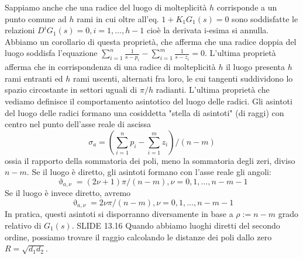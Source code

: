 \documentclass[11pt]{article}
\begin{document}
Sappiamo anche che una radice del luogo di molteplicità $h$ corrisponde a un punto comune ad $h$ rami in cui oltre all'eq. $1+K_1G_1(s)=0$ sono soddisfatte le relazioni $D^i G_1(s) = 0,i=1,\dots,h-1$ cioè la derivata i-esima si annulla. Abbiamo un corollario di questa proprietà, che afferma che una radice doppia del luogo soddisfa l'equazione $\sum_{i=1}^n \frac{1}{s-p_i} -\sum_{i=1}^m \frac{1}{s-z_i} = 0$. L'ultima proprietà afferma che in corrispondenza di una radice di molteplicità $h$ il luogo presenta $h$ rami entranti ed $h$ rami uscenti, alternati fra loro, le cui tangenti suddividono lo spazio circostante in settori uguali di $\pi/h$ radianti.
L'ultima proprietà che vediamo definisce il comportamento asintotico del luogo delle radici. Gli asintoti del luogo delle radici formano una cosiddetta "stella di asintoti" (di raggi) con centro nel punto dell'asse reale di ascissa
\begin{displaymath}
    \sigma_a = \left(\sum_{i=1}^n p_i - \sum_{i=1}^m z_i\right) / (n-m)
\end{displaymath}
ossia il rapporto della sommatoria dei poli, meno la sommatoria degli zeri, diviso $n-m$. Se il luogo è diretto, gli asintoti formano con l'asse reale gli angoli:
\begin{displaymath}
    \upvartheta_{a,\nu } = (2\nu +1)\pi / (n-m), \nu =0,1,\dots,n-m-1
\end{displaymath}
Se il luogo è invece diretto, avremo
\begin{displaymath}
    \upvartheta_{a,\nu} = 2\nu\pi/ (n-m), \nu=0,1,\dots,n-m-1
\end{displaymath}
In pratica, questi asintoti si disporranno diversamente in base a $\rho:=n-m$ grado relativo di $G_1(s)$.
SLIDE 13.16
Quando abbiamo luoghi diretti del secondo ordine, possiamo trovare il raggio calcolando le distanze dei poli dallo zero $R=\sqrt{d_1d_2}$.
\end{document}
